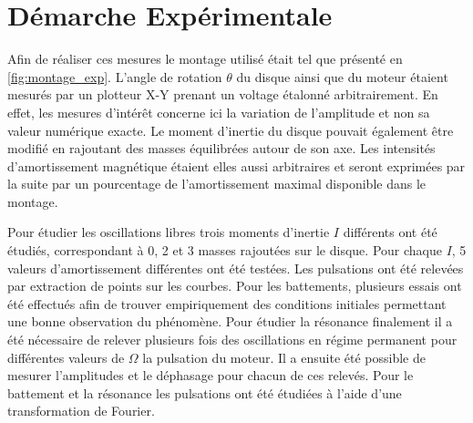 \section{Démarche Expérimentale}
Afin de réaliser ces mesures le montage utilisé était tel que présenté en \autoref{fig:montage_exp}. L'angle de rotation $\theta$ du disque ainsi que du moteur étaient mesurés par un plotteur X-Y prenant un voltage étalonné arbitrairement. En effet, les mesures d'intérêt concerne ici la variation de l'amplitude et non sa valeur numérique exacte. Le moment d'inertie du disque pouvait également être modifié en rajoutant des masses équilibrées autour de son axe. Les intensités d'amortissement magnétique étaient elles aussi arbitraires et seront exprimées par la suite par un pourcentage de l'amortissement maximal disponible dans le montage.

Pour étudier les oscillations libres trois moments d'inertie $I$ différents ont été étudiés, correspondant à 0, 2 et 3 masses rajoutées sur le disque. Pour chaque $I$, 5 valeurs d'amortissement différentes ont été testées. Les pulsations ont été relevées par extraction de points sur les courbes. Pour les battements, plusieurs essais ont été effectués afin de trouver empiriquement des conditions initiales permettant une bonne observation du phénomène. Pour étudier la résonance finalement il a été nécessaire de relever plusieurs fois des oscillations en régime permanent pour différentes valeurs de $\Omega$ la pulsation du moteur. Il a ensuite été possible de mesurer l'amplitudes et le déphasage pour chacun de ces relevés. Pour le battement et la résonance les pulsations ont été étudiées à l'aide d'une transformation de Fourier.